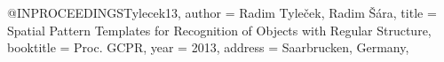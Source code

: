 @INPROCEEDINGS{Tylecek13,
  author = {Radim Tyle{\v c}ek, Radim {\v S}{\' a}ra},
  title = {Spatial Pattern Templates for Recognition of Objects with Regular Structure},
  booktitle = {Proc. GCPR},
  year = {2013},
  address = {Saarbrucken, Germany},
}
